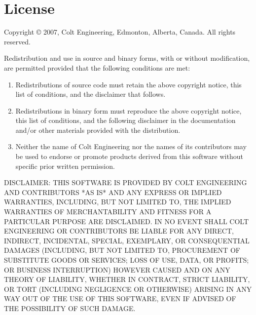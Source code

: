 \chapter{License}\label{license}

\centerline{}

Copyright \copyright{} 2007, Colt Engineering, Edmonton, Alberta, Canada.
All rights reserved.

Redistribution and use in source and binary forms, with or without
modification, are permitted provided that the following conditions are met:

\begin{enumerate}
\item
    Redistributions of source code must retain the above copyright notice,
    this list of conditions, and the disclaimer that follows.

\item
    Redistributions in binary form must reproduce the above copyright
    notice, this list of conditions, and the following disclaimer in the
    documentation and/or other materials provided with the distribution.

\item
    Neither the name of Colt Engineering nor the names of its contributors may
    be used to endorse or promote products derived from this software
    without specific prior written permission.
\end{enumerate}

DISCLAIMER:
THIS SOFTWARE IS PROVIDED BY COLT ENGINEERING AND CONTRIBUTORS *AS IS*
AND ANY EXPRESS OR IMPLIED WARRANTIES, INCLUDING, BUT NOT LIMITED TO,
THE IMPLIED WARRANTIES OF MERCHANTABILITY AND FITNESS FOR A
PARTICULAR PURPOSE ARE DISCLAIMED. IN NO EVENT SHALL COLT ENGINEERING
OR CONTRIBUTORS BE LIABLE FOR ANY DIRECT, INDIRECT, INCIDENTAL,
SPECIAL, EXEMPLARY, OR CONSEQUENTIAL DAMAGES (INCLUDING, BUT NOT
LIMITED TO, PROCUREMENT OF SUBSTITUTE GOODS OR SERVICES; LOSS OF
USE, DATA, OR PROFITS; OR BUSINESS INTERRUPTION) HOWEVER CAUSED
AND ON ANY THEORY OF LIABILITY, WHETHER IN CONTRACT, STRICT LIABILITY,
OR TORT (INCLUDING NEGLIGENCE OR OTHERWISE) ARISING IN ANY WAY OUT
OF THE USE OF THIS SOFTWARE, EVEN IF ADVISED OF THE POSSIBILITY OF
SUCH DAMAGE.

